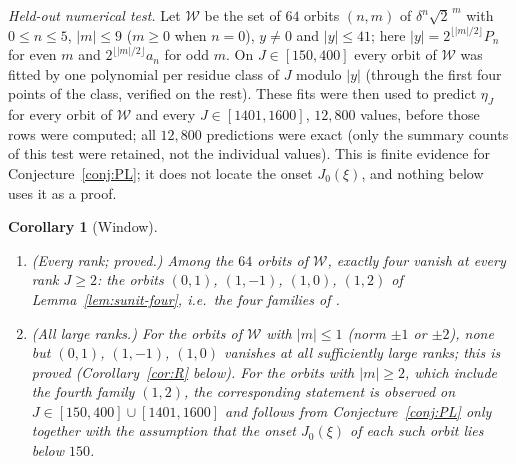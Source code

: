 \documentclass[11pt]{article}
\newtheorem{corollary}[theorem]{Corollary}
\theoremstyle{definition}
\begin{document}
\emph{Held-out numerical test.}  Let $\mathcal W$ be the set of $64$ orbits
$(n,m)$ of $\delta^n\sqrt2^{\,m}$ with $0\leq n\leq5$, $|m|\leq9$
($m\geq0$ when $n=0$), $y\neq0$ and $|y|\leq41$; here
$|y|=2^{\lfloor|m|/2\rfloor}P_n$ for even $m$ and
$2^{\lfloor|m|/2\rfloor}a_n$ for odd $m$.  On $J\in[150,400]$ every orbit
of $\mathcal W$ was fitted by one polynomial per residue class of $J$
modulo $|y|$ (through the first four points of the class, verified on
the rest).  These fits were then used to predict $\eta_J$ for every orbit
of $\mathcal W$ and every $J\in[1401,1600]$, $12{,}800$ values, before
those rows were computed; all $12{,}800$ predictions were exact (only
the summary counts of this test were retained, not the individual
values).  This is finite evidence for Conjecture~\ref{conj:PL}; it does
not locate the onset $J_0(\xi)$, and nothing below uses it as a proof.

\begin{corollary}[Window]
\label{cor:U}
\begin{enumerate}[label=(\alph*)]
\item \textup{(Every rank; proved.)}  Among the $64$ orbits of
$\mathcal W$, exactly four vanish at every rank $J\geq2$: the orbits
$(0,1)$, $(1,-1)$, $(1,0)$, $(1,2)$ of Lemma~\ref{lem:sunit-four}, i.e.\
the four families of \cite[Thm.~7.1]{MahmoodP1Collection2026}.
\item \textup{(All large ranks.)}  For the orbits of $\mathcal W$ with
$|m|\leq1$ (norm $\pm1$ or $\pm2$), none but $(0,1)$, $(1,-1)$, $(1,0)$
vanishes at all sufficiently large ranks; this is proved
(Corollary~\ref{cor:R} below).  For the orbits with $|m|\geq2$, which
include the fourth family $(1,2)$, the corresponding statement is
observed on $J\in[150,400]\cup[1401,1600]$ and follows from
Conjecture~\ref{conj:PL} only together with the assumption that the
onset $J_0(\xi)$ of each such orbit lies below $150$.
\end{enumerate}
\end{corollary}
\end{document}
